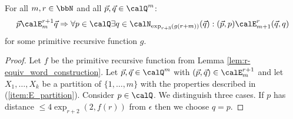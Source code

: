 \begin{lemma}\label{lem:EF_relations}
	For all $m,r\in\bbN$ and all $\vec{p},\vec{q}\in \Qx^m$:  
	\[\vec{p} \calE^{r+1}_m \vec{q} \Rightarrow \forall p\in \Qx \exists q\in \calN_{\exp_{r+3}(g(r+m))}(\vec{q}): (\vec{p}, p) \calE^{r}_{m+1} (\vec{q}, q)\]
	for some primitive recursive function $g$.
\end{lemma}
\begin{proof}
	Let $f$ be the primitive recursive function from Lemma \ref{lem:r-equiv_word_construction}.
	Let $\vec{p}, \vec{q} \in \Qx^m$ with $(\vec{p}, \vec{q}) \in \calE^{r+1}_m$ and 
	let $X_1,\ldots,X_k$ be a partition of $\{1,\ldots,m\}$ with the properties described in (\ref{item:E_partition}). 
	Consider $p\in \Qx$. We distinguish three cases.
	If $p$ has distance $\leq 4\exp_{r+2}(2, f(r))$ from $\epsilon$ then we choose $q=p$.
	

\end{proof}
